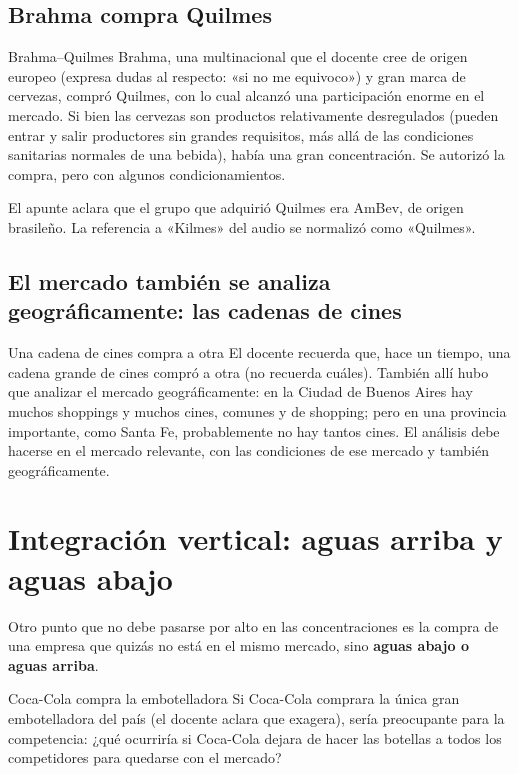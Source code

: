 \documentclass[12pt,oneside]{book}
\begin{document}
\subsection{Brahma compra Quilmes}

\begin{example}{Brahma--Quilmes}
Brahma, una multinacional que el docente cree de origen europeo (expresa dudas al respecto: «si no me equivoco») y gran marca de cervezas, compró Quilmes, con lo cual alcanzó una participación enorme en el mercado. Si bien las cervezas son productos relativamente desregulados (pueden entrar y salir productores sin grandes requisitos, más allá de las condiciones sanitarias normales de una bebida), había una gran concentración. Se autorizó la compra, pero con algunos condicionamientos.
\end{example}

\begin{note}
El apunte aclara que el grupo que adquirió Quilmes era AmBev, de origen brasileño. La referencia a «Kilmes» del audio se normalizó como «Quilmes».
\end{note}

\subsection{El mercado también se analiza geográficamente: las cadenas de cines}

\begin{example}{Una cadena de cines compra a otra}
El docente recuerda que, hace un tiempo, una cadena grande de cines compró a otra (no recuerda cuáles). También allí hubo que analizar el mercado geográficamente: en la Ciudad de Buenos Aires hay muchos shoppings y muchos cines, comunes y de shopping; pero en una provincia importante, como Santa Fe, probablemente no hay tantos cines. El análisis debe hacerse en el mercado relevante, con las condiciones de ese mercado y también geográficamente.
\end{example}

\section{Integración vertical: aguas arriba y aguas abajo}

Otro punto que no debe pasarse por alto en las concentraciones es la compra de una empresa que quizás no está en el mismo mercado, sino \textbf{aguas abajo o aguas arriba}.

\begin{example}{Coca-Cola compra la embotelladora}
Si Coca-Cola comprara la única gran embotelladora del país (el docente aclara que exagera), sería preocupante para la competencia: ¿qué ocurriría si Coca-Cola dejara de hacer las botellas a todos los competidores para quedarse con el mercado?
\end{example}
\end{document}

